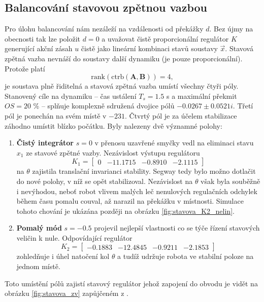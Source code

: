 \documentclass[conference]{IEEEtran}
\begin{document}
\subsection{Balancování stavovou zpětnou vazbou}
Pro úlohu balancování nám nezáleží na vzdálenosti od překážky $d$. Bez újmy na obecnosti tak lze položit $d = 0$
a uvažovat čistě proporcionální regulátor $K$ generující akční zásah $u$ čistě jako lineární kombinaci stavů soustavy $\vec{x}$.
Stavová zpětná vazba nevnáší do soustavy další dynamiku (je pouze proporcionální). Protože platí
\begin{equation}
    \text{rank}(\text{ctrb}(\mathbf{A}, \mathbf{B})) = 4,
\end{equation}
je soustava plně řiditelná a stavová zpětná vazba umístí všechny čtyři póly.
Stanovený cíle na dynamiku -- čas ustálení $T_s = 1.5$ \si{\second} a maximální překmit $OS = 20$ \% -- splňuje komplexně sdružená
dvojice pólů $-0.0267 \pm 0.0521i$. Třetí pól je ponechán na svém místě v $-231$. Čtvrtý pól je za účelem stabilizace záhodno umístit blízko počátku.
Byly nalezeny dvě významné polohy:
\begin{enumerate}
    \item \textbf{Čistý integrátor} $s = 0$ v přenosu uzavřené smyčky vedl na eliminaci stavu $x_1$ ze stavové zpětné vazby.
    Nezávislost výstupu regulátoru 
    \begin{equation*}
        K_1 = \begin{bmatrix}
            0 & -11.1715  & -0.8910  & -2.1115
        \end{bmatrix}
    \end{equation*}
    na $\theta$ zajistila translační invarianci stability. Segway tedy bylo možno dotlačit do nové polohy, v níž se opět stabilizoval. Nezávislost na $\theta$
    však byla souběžně i nevýhodou, neboť robot vlivem malých leč nenulových regulačních odchylek během času pomalu couval, až narazil na překážku v místnosti.
    Simulace tohoto chování je ukázána později na obrázku \ref{fig:stavova_K2_nelin}.

    \item \textbf{Pomalý mód} $s = -0.5$ projevil nejlepší vlastnosti co se týče řízení stavových veličin k nule. Odpovídající regulátor
    \begin{equation*}
        K_2 = \begin{bmatrix}
            -0.1883 & -12.4845 &  -0.9211 &  -2.1853
        \end{bmatrix}
    \end{equation*}
    zohledňuje i úhel natočení kol $\theta$ a tudíž udržuje robota ve stabilní poloze na jednom místě.
\end{enumerate}
Toto umístění pólů zajistí stavový regulátor
jehož zapojení do obvodu je vidět na obrázku \ref{fig:stavova_zv} zapůjčeném z \cite{img:full_state_feedback}.
\end{document}
